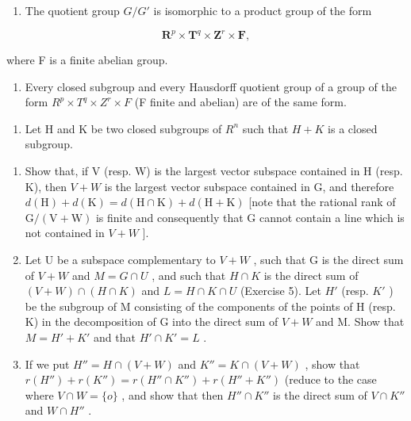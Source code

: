 
\begin{enumerate}
\def\labelenumi{\alph{enumi})}
\tightlist
\item
  The quotient group \(G/G'\) is isomorphic to a product group of the form
\end{enumerate}

\[
\mathbf {R} ^ {p} \times \mathbf {T} ^ {q} \times \mathbf {Z} ^ {r} \times \mathbf {F},
\]

where F is a finite abelian group.

\begin{enumerate}
\def\labelenumi{\alph{enumi})}
\setcounter{enumi}{1}
\tightlist
\item
  Every closed subgroup and every Hausdorff quotient group of a group of the form \(R^{p} \times T^{q} \times Z^{r} \times F\) (F finite and abelian) are of the same form.
\end{enumerate}

\begin{enumerate}
\def\labelenumi{\arabic{enumi})}
\setcounter{enumi}{5}
\tightlist
\item
  Let H and K be two closed subgroups of \(R^{n}\) such that \(H + K\) is a closed subgroup.
\end{enumerate}

\begin{enumerate}
\def\labelenumi{\alph{enumi})}
\item
  Show that, if V (resp. W) is the largest vector subspace contained in H (resp. K), then \(V + W\) is the largest vector subspace contained in G, and therefore \(d(\mathrm{H}) + d(\mathrm{K}) = d(\mathrm{H} \cap \mathrm{K}) + d(\mathrm{H} + \mathrm{K})\) {[}note that the rational rank of \(\mathrm{G}/(\mathrm{V} + \mathrm{W})\) is finite and consequently that G cannot contain a line which is not contained in \(V + W\) {]}.
\item
  Let U be a subspace complementary to \(V + W\) , such that G is the direct sum of \(V + W\) and \(M = G \cap U\) , and such that \(H \cap K\) is the direct sum of \((V + W) \cap (H \cap K)\) and \(L = H \cap K \cap U\) (Exercise 5). Let \(H'\) (resp. \(K'\) ) be the subgroup of M consisting of the components of the points of H (resp. K) in the decomposition of G into the direct sum of \(V + W\) and M. Show that \(M = H' + K'\) and that \(H' \cap K' = L\) .
\item
  If we put \(H'' = H \cap (V + W)\) and \(K'' = K \cap (V + W)\) , show that \(r(H'') + r(K'') = r(H'' \cap K'') + r(H'' + K'')\) (reduce to the case where \(V \cap W = \{o\}\) , and show that then \(H'' \cap K''\) is the direct sum of \(V \cap K''\) and \(W \cap H''\) .
\end{enumerate}

